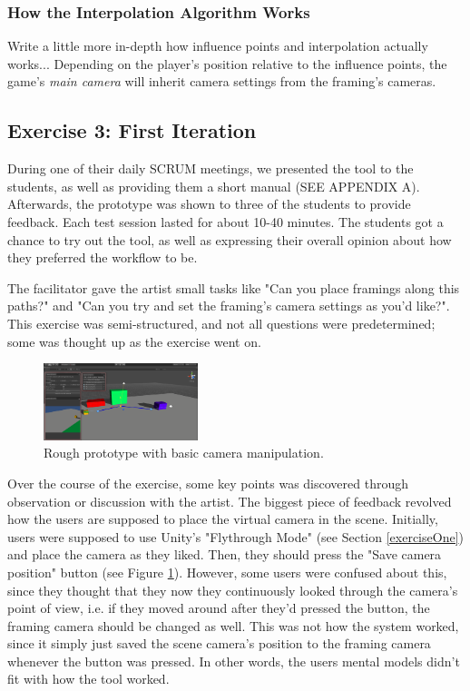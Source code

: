 \subsubsection{How the Interpolation Algorithm Works}
Write a little more in-depth how influence points and interpolation actually works...
Depending on the player's position relative to the influence points, the game's \textit{main camera} will inherit camera settings from the framing's cameras.



\subsection{Exercise 3: First Iteration}
During one of their daily SCRUM meetings, we presented the tool to the students, as well as providing them a short manual (SEE APPENDIX A). Afterwards, the prototype was shown to three of the students to provide feedback. Each test session lasted for about 10-40 minutes. The students got a chance to try out the tool, as well as expressing their overall opinion about how they preferred the workflow to be.

The facilitator gave the artist small tasks like "Can you place framings along this paths?" and "Can you try and set the framing's camera settings as you'd like?". This exercise was semi-structured, and not all questions were predetermined; some was thought up as the exercise went on.

\begin{figure}[htbp]
\centering
\includegraphics[width=0.40\textwidth]{Pics/MainSetup}
\caption{Rough prototype with basic camera manipulation.}
\label{fig:prototype}
\end{figure}

Over the course of the exercise, some key points was discovered through observation or discussion with the artist. The biggest piece of feedback revolved how the users are supposed to place the virtual camera in the scene. Initially, users were supposed to use Unity's "Flythrough Mode" (see Section \ref{exerciseOne}) and place the camera as they liked. Then, they should press the "Save camera position" button (see Figure \ref{fig:prototype}). However, some users were confused about this, since they thought that they now they continuously looked through the camera's point of view, i.e. if they moved around after they'd pressed the button, the framing camera should be changed as well. This was not how the system worked, since it simply just saved the scene camera's position to the framing camera whenever the button was pressed. In other words, the users mental models didn't fit with how the tool worked.
